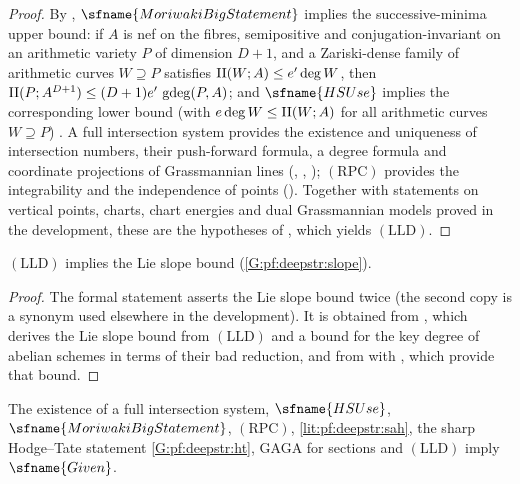 \begin{proof}
By , $\sfname{MoriwakiBigStatement}$ implies the
successive-minima upper bound: if $A$ is nef on the fibres, semipositive and conjugation-invariant on an
arithmetic variety $P$ of dimension $D+1$, and a Zariski-dense family of arithmetic curves $W\supseteq P$
satisfies $\mathrm{II}(W;A)\le e'\deg W$, then $\mathrm{II}(P;A^{D+1})\le(D+1)e'\,\operatorname{gdeg}(P,A)$; and
$\sfname{HSUse}$ implies the corresponding lower bound (with $e\deg W\le\mathrm{II}(W;A)$ for all arithmetic
curves $W\supseteq P$) \cite{Zhang1995}. A full
intersection system provides the existence and uniqueness of intersection numbers, their push-forward
formula, a degree formula and coordinate projections of Grassmannian lines
(,
,
); $\mathrm{(RPC)}$ provides the
integrability and the independence of points ().
Together with statements on vertical points, charts, chart energies and dual Grassmannian models proved in
the development, these are the hypotheses of
, which yields $\mathrm{(LLD)}$.
\end{proof}

\begin{theorem}\label{thm:pf:deepstr:slopebound}
$\mathrm{(LLD)}$ implies the Lie slope bound (\ref{G:pf:deepstr:slope}).
\end{theorem}

\begin{proof}
The formal statement asserts the Lie slope bound twice (the second copy is a synonym used elsewhere in
the development). It is obtained from
, which derives the Lie slope bound from
$\mathrm{(LLD)}$ and a bound for the key degree of abelian schemes in terms of their bad reduction, and from
 with
, which provide that bound.
\end{proof}

\begin{theorem}\label{thm:pf:deepstr:given}
The existence of a full intersection system, $\sfname{HSUse}$, $\sfname{MoriwakiBigStatement}$, $\mathrm{(RPC)}$,
\cref{lit:pf:deepstr:sah}, the sharp Hodge--Tate statement \ref{G:pf:deepstr:ht}, GAGA for sections and $\mathrm{(LLD)}$ imply
$\sfname{Given}$. 
\end{theorem}

